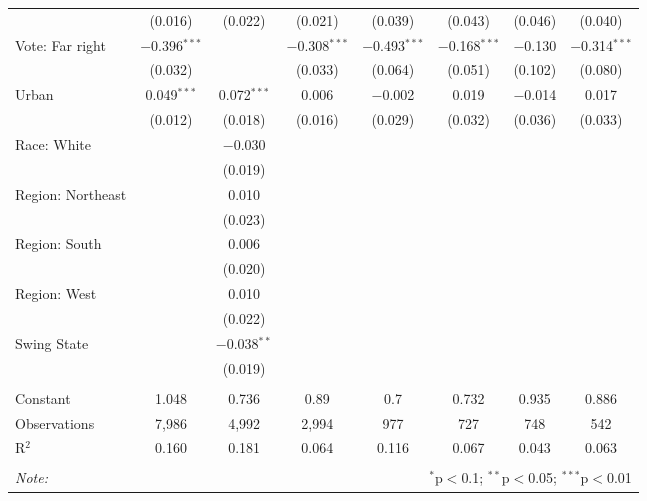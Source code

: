 \begin{tabular}{@{\extracolsep{5pt}}lccccccc}
  & (0.016) & (0.022) & (0.021) & (0.039) & (0.043) & (0.046) & (0.040) \\ 
  Vote: Far right & $-$0.396$^{***}$ &  & $-$0.308$^{***}$ & $-$0.493$^{***}$ & $-$0.168$^{***}$ & $-$0.130 & $-$0.314$^{***}$ \\ 
  & (0.032) &  & (0.033) & (0.064) & (0.051) & (0.102) & (0.080) \\ 
  Urban & 0.049$^{***}$ & 0.072$^{***}$ & 0.006 & $-$0.002 & 0.019 & $-$0.014 & 0.017 \\ 
  & (0.012) & (0.018) & (0.016) & (0.029) & (0.032) & (0.036) & (0.033) \\ 
  Race: White &  & $-$0.030 &  &  &  &  &  \\ 
  &  & (0.019) &  &  &  &  &  \\ 
  Region: Northeast &  & 0.010 &  &  &  &  &  \\ 
  &  & (0.023) &  &  &  &  &  \\ 
  Region: South &  & 0.006 &  &  &  &  &  \\ 
  &  & (0.020) &  &  &  &  &  \\ 
  Region: West &  & 0.010 &  &  &  &  &  \\ 
  &  & (0.022) &  &  &  &  &  \\ 
  Swing State &  & $-$0.038$^{**}$ &  &  &  &  &  \\ 
  &  & (0.019) &  &  &  &  &  \\ 
 \hline \\[-1.8ex] 
Constant & 1.048 & 0.736 & 0.89 & 0.7 & 0.732 & 0.935 & 0.886 \\ 
Observations & 7,986 & 4,992 & 2,994 & 977 & 727 & 748 & 542 \\ 
R$^{2}$ & 0.160 & 0.181 & 0.064 & 0.116 & 0.067 & 0.043 & 0.063 \\ 
\hline 
\hline \\[-1.8ex] 
\textit{Note:}  & \multicolumn{7}{r}{$^{*}$p$<$0.1; $^{**}$p$<$0.05; $^{***}$p$<$0.01} \\ 
\end{tabular} 